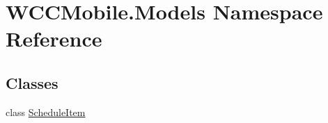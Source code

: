 \hypertarget{namespace_w_c_c_mobile_1_1_models}{}\section{W\+C\+C\+Mobile.\+Models Namespace Reference}
\label{namespace_w_c_c_mobile_1_1_models}
\subsection*{Classes}
\begin{DoxyCompactItemize}
\item 
class \hyperlink{class_w_c_c_mobile_1_1_models_1_1_schedule_item}{Schedule\+Item}
\end{DoxyCompactItemize}
